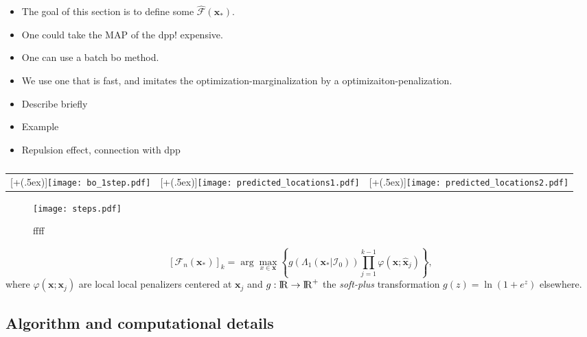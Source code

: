 \documentclass[twoside]{article}
\def\bbbr{{\rm I\!R}}
\newcommand{\I}{\mathcal{I}}
\newcommand{\bx}{\textbf{x}}
\newcommand{\future}{\mathcal{F}}
\newcommand*{\addheight}[2][.5ex]{%
  \raisebox{0pt}[\dimexpr\height+(#1)\relax]{#2}%
}
\begin{document}
\begin{itemize}
\item The goal of this section is to define some $\hat{\future}(\bx_*)$.
\item One could take the MAP of the dpp! expensive.
\item One can use a batch bo method.
\item We use one that is fast, and imitates the optimization-marginalization by a optimizaiton-penalization.
\item Describe briefly
\item Example
\item Repulsion effect, connection with dpp
\end{itemize}


\begin{table*}[t!]
\begin{tabular}{ccc}
      \addheight{\texttt{[image: bo\_1step.pdf]}} &
      \addheight{\texttt{[image: predicted\_locations1.pdf]}}  &
      \addheight{\texttt{[image: predicted\_locations2.pdf]}}\\
\end{tabular}\caption{}
\end{table*}


\begin{figure*}[t!]
\begin{center}
\texttt{[image: steps.pdf]}
\end{center}\caption{ffff}
\end{figure*}

\begin{equation}\label{eq:penalized_acquisition}
 [\future_n(\bx_*)]_k  =\arg \max_{x \in \bx} \left\{g(\Lambda_1(\bx_*| \I_0))\prod_{j=1}^{k-1}\varphi(\bx;\hat{\bx}_{j})\right\},
\end{equation}
where $\varphi(\bx;\bx_{j})$ are local local penalizers centered at $\bx_{j}$ and $g:\bbbr \rightarrow \bbbr^+$  the \emph{soft-plus} transformation $g(z)= \ln(1+e^z)$ elsewhere.


\subsection{Algorithm and computational details}
\end{document}
